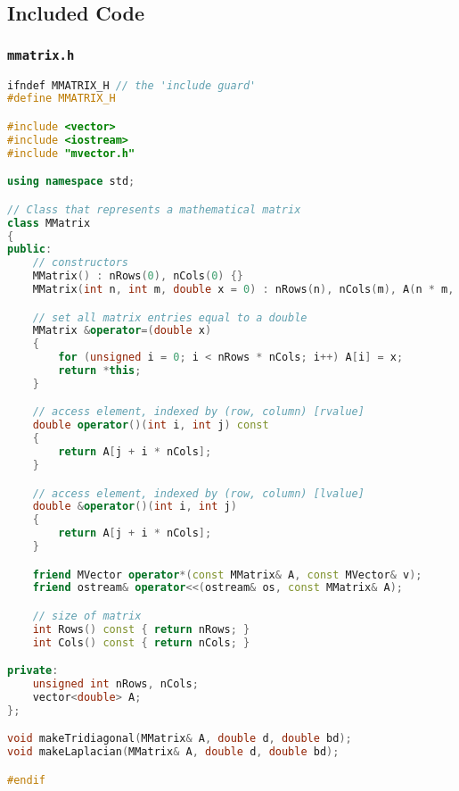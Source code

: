 \documentclass{article}
\begin{document}
\subsection{Included Code}

\subsubsection{\texttt{mmatrix.h}}
\begin{lstlisting}[language=c++]
ifndef MMATRIX_H // the 'include guard'
#define MMATRIX_H

#include <vector>
#include <iostream>
#include "mvector.h"

using namespace std;

// Class that represents a mathematical matrix
class MMatrix
{
public:
	// constructors
	MMatrix() : nRows(0), nCols(0) {}
	MMatrix(int n, int m, double x = 0) : nRows(n), nCols(m), A(n * m, x) {}

	// set all matrix entries equal to a double
	MMatrix &operator=(double x)
	{
		for (unsigned i = 0; i < nRows * nCols; i++) A[i] = x;
		return *this;
	}

	// access element, indexed by (row, column) [rvalue]
	double operator()(int i, int j) const
	{
		return A[j + i * nCols];
	}

	// access element, indexed by (row, column) [lvalue]
	double &operator()(int i, int j)
	{
		return A[j + i * nCols];
	}

	friend MVector operator*(const MMatrix& A, const MVector& v);
	friend ostream& operator<<(ostream& os, const MMatrix& A);

	// size of matrix
	int Rows() const { return nRows; }
	int Cols() const { return nCols; }

private:
	unsigned int nRows, nCols;
	vector<double> A;
};

void makeTridiagonal(MMatrix& A, double d, double bd);
void makeLaplacian(MMatrix& A, double d, double bd);

#endif
\end{lstlisting}
\end{document}
